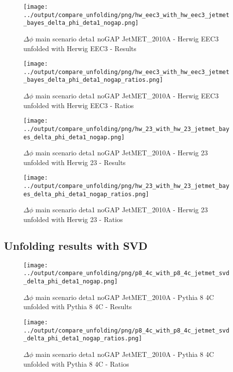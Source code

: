 \documentclass[11pt]{book}
\begin{document}
\begin{figure}[ht]
\centering
\texttt{[image: ../output/compare\_unfolding/png/hw\_eec3\_with\_hw\_eec3\_jetmet\_bayes\_delta\_phi\_deta1\_nogap.png]}
\caption{$\Delta\phi$ main scenario deta1 noGAP JetMET\_2010A - Herwig EEC3 unfolded with Herwig EEC3 - Results}
\label{hw_eec3_hw_eec3_jetmet_bayes_delta_phi_deta1_nogap_a}
\end{figure}

\begin{figure}[ht]
\centering
\texttt{[image: ../output/compare\_unfolding/png/hw\_eec3\_with\_hw\_eec3\_jetmet\_bayes\_delta\_phi\_deta1\_nogap\_ratios.png]}
\caption{$\Delta\phi$ main scenario deta1 noGAP JetMET\_2010A - Herwig EEC3 unfolded with Herwig EEC3 - Ratios}
\label{hw_eec3_hw_eec3_jetmet_bayes_delta_phi_deta1_nogap_b}
\end{figure}

\begin{figure}[ht]
\centering
\texttt{[image: ../output/compare\_unfolding/png/hw\_23\_with\_hw\_23\_jetmet\_bayes\_delta\_phi\_deta1\_nogap.png]}
\caption{$\Delta\phi$ main scenario deta1 noGAP JetMET\_2010A - Herwig 23 unfolded with Herwig 23 - Results}
\label{hw_23_hw_23_jetmet_bayes_delta_phi_deta1_nogap_a}
\end{figure}

\begin{figure}[ht]
\centering
\texttt{[image: ../output/compare\_unfolding/png/hw\_23\_with\_hw\_23\_jetmet\_bayes\_delta\_phi\_deta1\_nogap\_ratios.png]}
\caption{$\Delta\phi$ main scenario deta1 noGAP JetMET\_2010A - Herwig 23 unfolded with Herwig 23 - Ratios}
\label{hw_23_hw_23_jetmet_bayes_delta_phi_deta1_nogap_b}
\end{figure}


\clearpage
\subsection{Unfolding results with SVD}

\begin{figure}[ht]
\centering
\texttt{[image: ../output/compare\_unfolding/png/p8\_4c\_with\_p8\_4c\_jetmet\_svd\_delta\_phi\_deta1\_nogap.png]}
\caption{$\Delta\phi$ main scenario deta1 noGAP JetMET\_2010A - Pythia 8 4C unfolded with Pythia 8 4C - Results}
\label{p8_p8_jetmet_svd_delta_phi_deta1_nogap_a}
\end{figure}

\begin{figure}[ht]
\centering
\texttt{[image: ../output/compare\_unfolding/png/p8\_4c\_with\_p8\_4c\_jetmet\_svd\_delta\_phi\_deta1\_nogap\_ratios.png]}
\caption{$\Delta\phi$ main scenario deta1 noGAP JetMET\_2010A - Pythia 8 4C unfolded with Pythia 8 4C - Ratios}
\label{p8_p8_jetmet_svd_delta_phi_deta1_nogap_b}
\end{figure}
\end{document}
